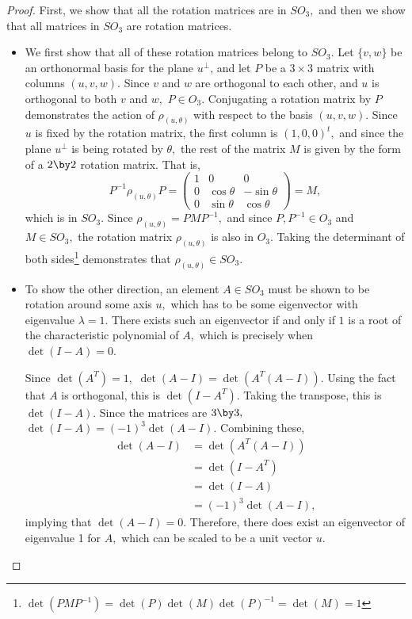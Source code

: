 \begin{proof}

First, we show that all the rotation matrices are in $SO_3,$ and then we show that all matrices in $SO_3$ are rotation matrices.
\begin{itemize}
    \item  We first show that all of these rotation matrices belong to $SO_3$. Let $\{v, w\}$ be an orthonormal basis for the plane $u^\perp$, and let $P$ be a $3\times 3$ matrix with columns $(u,v,w)$. Since $v$ and $w$ are orthogonal to each other, and $u$ is orthogonal to both $v$ and $w,$ $P \in O_3.$ Conjugating a rotation matrix by $P$ demonstrates the action of $\rho_{(u, \theta)}$ with respect to the basis $(u, v, w).$ Since $u$ is fixed by the rotation matrix, the first column is $(1, 0, 0)^t,$ and since the plane $u^{\perp}$ is being rotated by $\theta,$ the rest of the matrix $M$ is given by the form of a $2 \by 2$ rotation matrix. That is,
    \[
    P^{-1}\rho_{(u, \theta)}P = \begin{pmatrix} 1 & 0 & 0 \\ 0 & \cos \theta & -\sin \theta \\ 0 & \sin \theta & \cos \theta \end{pmatrix} = M,
    \] which is in $SO_3.$ Since $\rho_{(u, \theta)} = PMP^{-1},$ and since $P, P^{-1} \in O_3$ and $M \in SO_3,$ the rotation matrix $\rho_{(u, \theta)}$ is also in $O_3.$ Taking the determinant of both sides\footnote{$\det(PMP^{-1}) = \det(P)\det(M)\det(P)^{-1} = \det(M) = 1$} demonstrates that $\rho_{(u, \theta)} \in SO_3.$
    
\item 
    To show the other direction, an element $A \in SO_3$ must be shown to be rotation around some axis $u,$ which has to be some eigenvector with eigenvalue $\lambda = 1$. There exists such an eigenvector if and only if $1$ is a root of the characteristic polynomial of $A,$ which is precisely when $\det(I-A) = 0.$
    
    Since $\det(A^T) = 1,$ $\det(A - I) = \det(A^T(A - I)).$ Using the fact that $A$ is orthogonal, this is $\det(I - A^T).$ Taking the transpose, this is $\det(I - A).$ Since the matrices are $3 \by 3,$ $\det(I-A) = (-1)^3\det(A-I).$
    Combining these,
    \begin{align*}
        \det(A-I) &= \det(A^T (A - I)) \\
                  &= \det(I - A^T) \\
                  &= \det(I-A) \\
                  &= (-1)^3 \det(A-I),
    \end{align*}
    implying that $\det(A-I) = 0.$ Therefore, there does exist an eigenvector of eigenvalue 1 for $A,$ which can be scaled to be a unit vector $u.$


\end{itemize}
\end{proof}
